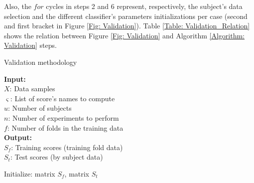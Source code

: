 Also, the $for$ cycles in steps 2 and 6 represent, respectively, the subject's data selection and the different classifier's parameters initializations per case (second and first bracket in Figure \ref{Fig: Validation}). Table \ref{Table: Validation_Relation} shows the relation between Figure \ref{Fig: Validation} and Algorithm \ref{Algorithm: Validation} steps.\\

\begin{algorithm}
\caption{Validation methodology}
\label{Algorithm: Validation}
\hspace*{\algorithmicindent} \textbf{Input:} \\
\hspace*{\algorithmicindent}\hspace*{\algorithmicindent} $X$: Data samples \\
\hspace*{\algorithmicindent}\hspace*{\algorithmicindent} $\varsigma$: List of score's names to compute \\
\hspace*{\algorithmicindent}\hspace*{\algorithmicindent} $u$: Number of subjects \\
\hspace*{\algorithmicindent}\hspace*{\algorithmicindent} $n$: Number of experiments to perform \\
\hspace*{\algorithmicindent}\hspace*{\algorithmicindent} $f$: Number of folds in the training data \\
\hspace*{\algorithmicindent} \textbf{Output:} \\
\hspace*{\algorithmicindent}\hspace*{\algorithmicindent} $S_{f}$: Training scores (training fold data) \\
\hspace*{\algorithmicindent}\hspace*{\algorithmicindent} $S_{t}$: Test scores (by subject data) \\
\begin{algorithmic}[1]
	\STATE Initialize: matrix $S_{f}$, matrix $S_{t}$
\end{algorithmic}
\end{algorithm}
